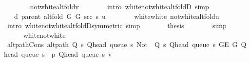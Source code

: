 \begin{isabellebody}
\ \ \ \ \ \ \isamarkupfalse%
\ not{\isacharunderscore}{\kern0pt}white{\isacharunderscore}{\kern0pt}alt{\isacharunderscore}{\kern0pt}fold{\isacharunderscore}{\kern0pt}v\isanewline
\ \ \ \ \ \ \isamarkupfalse%
\ {\isacharparenleft}{\kern0pt}intro\ white{\isacharunderscore}{\kern0pt}not{\isacharunderscore}{\kern0pt}white{\isacharunderscore}{\kern0pt}alt{\isacharunderscore}{\kern0pt}foldD{\isacharunderscore}{\kern0pt}{}{\isacharparenright}{\kern0pt}\ simp\isanewline
\ \ \ \ \isamarkupfalse%
\ \isamarkupfalse%
\ {\isachardoublequoteopen}{\isachardot}{\kern0pt}{\isachardot}{\kern0pt}{\isachardot}{\kern0pt}\ {\isacharequal}{\kern0pt}\ d\ {\isacharparenleft}{\kern0pt}parent\ {\isacharparenleft}{\kern0pt}alt{\isacharunderscore}{\kern0pt}fold\ G{}\ G{}\ src\ s{\isacharparenright}{\kern0pt}{\isacharparenright}{\kern0pt}\ u{\isachardoublequoteclose}\isanewline
\ \ \ \ \ \ \isamarkupfalse%
\ white{\isacharunderscore}{\kern0pt}white\ not{\isacharunderscore}{\kern0pt}white{\isacharunderscore}{\kern0pt}alt{\isacharunderscore}{\kern0pt}fold{\isacharunderscore}{\kern0pt}u\isanewline
\ \ \ \ \ \ \isamarkupfalse%
\ {\isacharparenleft}{\kern0pt}intro\ white{\isacharunderscore}{\kern0pt}not{\isacharunderscore}{\kern0pt}white{\isacharunderscore}{\kern0pt}alt{\isacharunderscore}{\kern0pt}foldD{\isacharunderscore}{\kern0pt}{}{\isacharbrackleft}{\kern0pt}symmetric{\isacharbrackright}{\kern0pt}{\isacharparenright}{\kern0pt}\ simp\isanewline
\ \ \ \ \isamarkupfalse%
\ \isamarkupfalse%
\ {\isacharquery}{\kern0pt}thesis\isanewline
\ \ \ \ \ \ \isamarkupfalse%
\ simp\isanewline
\ \ \isamarkupfalse%
\isanewline
\ \ \ \ \isamarkupfalse%
\ white{\isacharunderscore}{\kern0pt}not{\isacharunderscore}{\kern0pt}white\isanewline
\ \ \ \ \isamarkupfalse%
\ alt{\isacharunderscore}{\kern0pt}path{\isacharunderscore}{\kern0pt}Cons{\isacharcolon}{\kern0pt}\ {\isachardoublequoteopen}alt{\isacharunderscore}{\kern0pt}path\ {\isacharparenleft}{\kern0pt}Q\ s\ {\isacharparenleft}{\kern0pt}Q{\isacharunderscore}{\kern0pt}head\ {\isacharparenleft}{\kern0pt}queue\ s{\isacharparenright}{\kern0pt}{\isacharparenright}{\kern0pt}{\isacharparenright}{\kern0pt}\ {\isacharparenleft}{\kern0pt}Not\ {\isasymcirc}\ Q\ s\ {\isacharparenleft}{\kern0pt}Q{\isacharunderscore}{\kern0pt}head\ {\isacharparenleft}{\kern0pt}queue\ s{\isacharparenright}{\kern0pt}{\isacharparenright}{\kern0pt}{\isacharparenright}{\kern0pt}\ {\isacharparenleft}{\kern0pt}G{\isachardot}{\kern0pt}E\ G{\isacharparenright}{\kern0pt}\ {\isacharparenleft}{\kern0pt}Q{\isacharunderscore}{\kern0pt}head\ {\isacharparenleft}{\kern0pt}queue\ s{\isacharparenright}{\kern0pt}\ {\isacharhash}{\kern0pt}\ p{\isacharparenright}{\kern0pt}\ {\isacharparenleft}{\kern0pt}Q{\isacharunderscore}{\kern0pt}head\ {\isacharparenleft}{\kern0pt}queue\ s{\isacharparenright}{\kern0pt}{\isacharparenright}{\kern0pt}\ v{\isachardoublequoteclose}\isanewline

\end{isabellebody}
